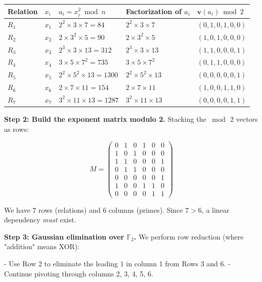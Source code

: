 \begin{center}
\begin{tabular}{lllll}
\toprule
Relation & $x_i$ & $a_i = x_i^2 \bmod n$ & Factorization of $a_i$ & $\mathbf{v}(a_i) \bmod 2$ \\
\midrule
$R_1$ & $x_1$ & $2^2 \times 3 \times 7 = 84$ & $2^2 \times 3 \times 7$ & $(0, 1, 0, 1, 0, 0)$ \\
$R_2$ & $x_2$ & $2 \times 3^2 \times 5 = 90$ & $2 \times 3^2 \times 5$ & $(1, 0, 1, 0, 0, 0)$ \\
$R_3$ & $x_3$ & $2^3 \times 3 \times 13 = 312$ & $2^3 \times 3 \times 13$ & $(1, 1, 0, 0, 0, 1)$ \\
$R_4$ & $x_4$ & $3 \times 5 \times 7^2 = 735$ & $3 \times 5 \times 7^2$ & $(0, 1, 1, 0, 0, 0)$ \\
$R_5$ & $x_5$ & $2^2 \times 5^2 \times 13 = 1300$ & $2^2 \times 5^2 \times 13$ & $(0, 0, 0, 0, 0, 1)$ \\
$R_6$ & $x_6$ & $2 \times 7 \times 11 = 154$ & $2 \times 7 \times 11$ & $(1, 0, 0, 1, 1, 0)$ \\
$R_7$ & $x_7$ & $3^2 \times 11 \times 13 = 1287$ & $3^2 \times 11 \times 13$ & $(0, 0, 0, 0, 1, 1)$ \\
\bottomrule
\end{tabular}
\end{center}


\textbf{Step 2: Build the exponent matrix modulo 2.} Stacking the $\bmod\, 2$ vectors as rows:

\[M = \begin{pmatrix} 0 & 1 & 0 & 1 & 0 & 0 \\ 1 & 0 & 1 & 0 & 0 & 0 \\ 1 & 1 & 0 & 0 & 0 & 1 \\ 0 & 1 & 1 & 0 & 0 & 0 \\ 0 & 0 & 0 & 0 & 0 & 1 \\ 1 & 0 & 0 & 1 & 1 & 0 \\ 0 & 0 & 0 & 0 & 1 & 1 \end{pmatrix}\]

We have $7$ rows (relations) and $6$ columns (primes). Since $7 > 6$, a linear dependency \textit{must} exist.

\textbf{Step 3: Gaussian elimination over $\mathbb{F}_2$.} We perform row reduction (where "addition" means XOR):

- Use Row 2 to eliminate the leading $1$ in column 1 from Rows 3 and 6.
- Continue pivoting through columns 2, 3, 4, 5, 6.

